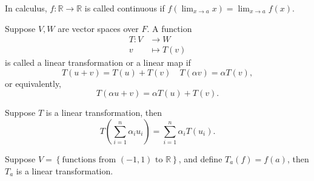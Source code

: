 In calculus, \(f: \mathbb{R} \to \mathbb{R} \) is called continuous if \(f \left( \lim_{x \to a} x  \right) = \lim_{x \to a}f(x)  \). 

\begin{definition} \label{def: linear transformation}
    Suppose \(V, W\) are vector spaces over \(F\). A function 
    \begin{align*}
        T: V &\to W \\
        v &\mapsto T(v)
    \end{align*} 
    is called a linear transformation or a linear map if 
    \[
        T(u+v) = T(u) + T(v) \quad T(\alpha v) = \alpha T(v),
    \]
    or equivalently, 
    \[
        T(\alpha u + v) = \alpha T(u) + T(v).
    \]
\end{definition}

\begin{corollary}
    Suppose \(T\) is a linear transformation, then 
    \[
        T \left( \sum_{i=1}^n \alpha _i u_i  \right) = \sum_{i=1}^n \alpha _i T(u_i).  
    \]
\end{corollary}

\begin{eg}
    Suppose \(V = \left\{ \text{functions from } (-1,1) \text{ to } \mathbb{R}  \right\} \), and define \(T_a(f) = f(a)\), then \(T_a\) is a linear transformation.  
\end{eg}

